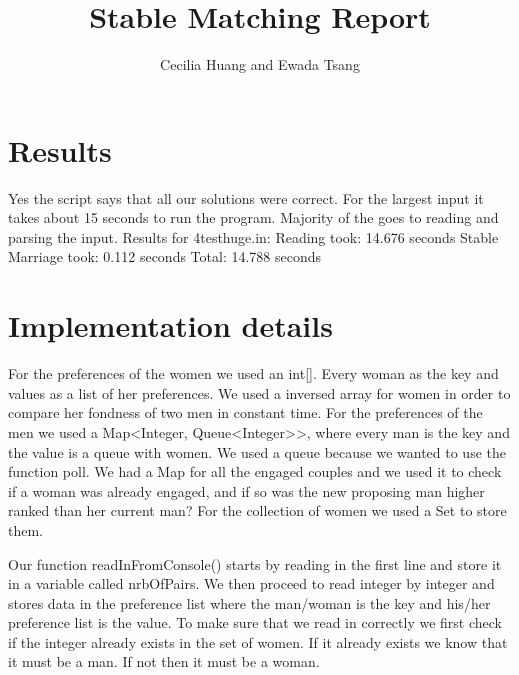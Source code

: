 \documentclass{article}
\title{Stable Matching Report}
\author{Cecilia Huang and Ewada Tsang}
\begin{document}
  \maketitle

  \section{Results}


    Yes the script says that all our solutions were correct.
    For the largest input it takes about 15 seconds to run the program. Majority of the goes to reading and parsing the input.
    Results for 4testhuge.in:
    Reading took: 14.676 seconds
    Stable Marriage took: 0.112 seconds
    Total: 14.788 seconds

  \section{Implementation details}


    For the preferences of the women we used an int[]. Every woman as the key and values as a list of her preferences. We used a inversed array for women in order to compare her fondness of two men in constant time.
    For the preferences of the men we used a Map<Integer, Queue<Integer>>, where every man is the key and the value is a queue with women.
    We used a queue because we wanted to use the function poll.
    We had a Map for all the engaged couples and we used it to check if a woman was already engaged, and if so was the new proposing man higher ranked than her current man?
    For the collection of women we used a Set to store them.

    Our function readInFromConsole() starts by reading in the first line and store it in a variable called nrbOfPairs. We then proceed to read integer by integer
    and stores data in the preference list where the man/woman is the key and his/her preference list is the value. To make sure that we read in correctly we first
    check if the integer already exists in the set of women. If it already exists we know that it must be a man. If not then it must be a woman.
\end{document}
